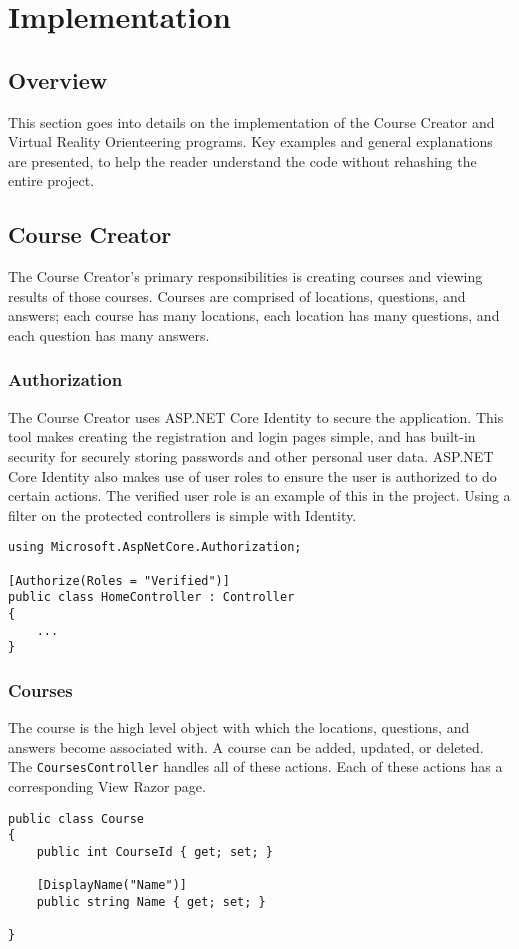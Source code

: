 \section{Implementation}																	
\label{sec:Implementation}

\subsection{Overview} 
This section goes into details on the implementation of the Course Creator and Virtual Reality Orienteering programs. Key examples and general explanations are presented, to help the reader understand the code without rehashing the entire project. 

\subsection{Course Creator}
The Course Creator's primary responsibilities is creating courses and viewing results of those courses. Courses are comprised of locations, questions, and answers; each course has many locations, each location has many questions, and each question has many answers. 

\subsubsection{Authorization}
The Course Creator uses ASP.NET Core Identity to secure the application. This tool makes creating the registration and login pages simple, and has built-in security for securely storing passwords and other personal user data. ASP.NET Core Identity also makes use of user roles to ensure the user is authorized to do certain actions. The verified user role is an example of this in the project. Using a filter on the protected controllers is simple with Identity.
\begin{lstlisting}[caption=Securing Controllers using Filter on User Role, label=lst:FilterUserRole]
using Microsoft.AspNetCore.Authorization;

[Authorize(Roles = "Verified")]
public class HomeController : Controller
{
	...
}
\end{lstlisting} 
\subsubsection{Courses}
The course is the high level object with which the locations, questions, and answers become associated with. A course can be added, updated, or deleted. The \lstinline{CoursesController} handles all of these actions. Each of these actions has a corresponding View Razor page. 
\begin{lstlisting}[caption=Course Model, label=lst:CourseModel]
public class Course
{
	public int CourseId { get; set; }
	
	[DisplayName("Name")]
	public string Name { get; set; }

}
\end{lstlisting}

